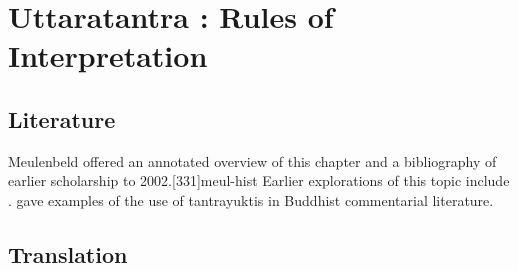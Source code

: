 
\chapter{Uttaratantra :  Rules of Interpretation}

\section{Literature} 

Meulenbeld offered an annotated overview of this chapter and a bibliography
of earlier scholarship to 2002.[331]{meul-hist}  Earlier explorations 
of this topic include \cite{dasg-1952,
    lele-1981,
    mejo-2000,
    nara-1949,
    ober-1967,
    scha-1993,
    sing-2003,
    muth-1976}. 
\cite{mane-2008} gave examples of the use of tantrayuktis in Buddhist 
commentarial literature.

\section{Translation}

